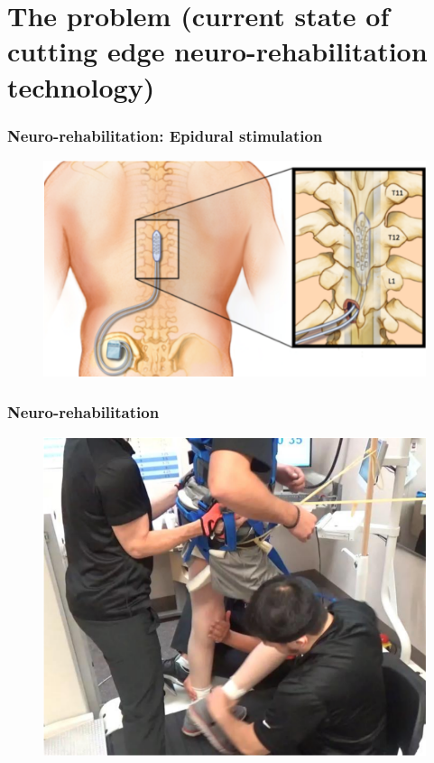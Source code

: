 \documentclass[12pt, aspectratio=169]{beamer}
\begin{document}
\section{The problem (current state of cutting edge neuro-rehabilitation technology)}
\begin{frame}
  \frametitle{Neuro-rehabilitation: Epidural stimulation}
  \begin{figure}
    \includegraphics[width=0.6\linewidth]{epidural_stimulation_spinal_cord}
  \end{figure}
\end{frame}

\begin{frame}
  \frametitle{Neuro-rehabilitation}
  \begin{figure}
    \includegraphics[width=0.5\linewidth]{neurorehabilitation}
  \end{figure}
\end{frame}

\end{document}
